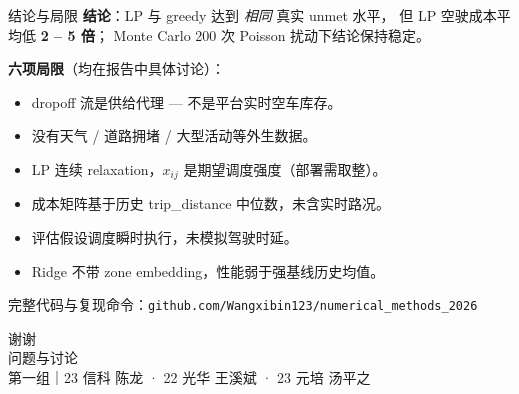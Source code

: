 \documentclass[aspectratio=169,11pt]{beamer}
\begin{document}
\begin{frame}{结论与局限}
\textbf{结论}：LP 与 greedy 达到 \emph{相同} 真实 unmet 水平，
但 LP 空驶成本平均低 \textbf{2 – 5 倍}；
Monte Carlo 200 次 Poisson 扰动下结论保持稳定。

\vspace{0.5em}
\textbf{六项局限}（均在报告中具体讨论）：
\begin{itemize}\small\itemsep=1pt
\item dropoff 流是供给代理 — 不是平台实时空车库存。
\item 没有天气 / 道路拥堵 / 大型活动等外生数据。
\item LP 连续 relaxation，$x_{ij}$ 是期望调度强度（部署需取整）。
\item 成本矩阵基于历史 trip\_distance 中位数，未含实时路况。
\item 评估假设调度瞬时执行，未模拟驾驶时延。
\item Ridge 不带 zone embedding，性能弱于强基线历史均值。
\end{itemize}

\vspace{0.5em}
完整代码与复现命令：\verb|github.com/Wangxibin123/numerical_methods_2026|
\end{frame}

\begin{frame}
\begin{center}
{\Huge 谢谢}\\
\vspace{1em}
{\large 问题与讨论}\\
\vspace{2em}
{\small 第一组｜23 信科 陈龙 · 22 光华 王溪斌 · 23 元培 汤平之}
\end{center}
\end{frame}
\end{document}
